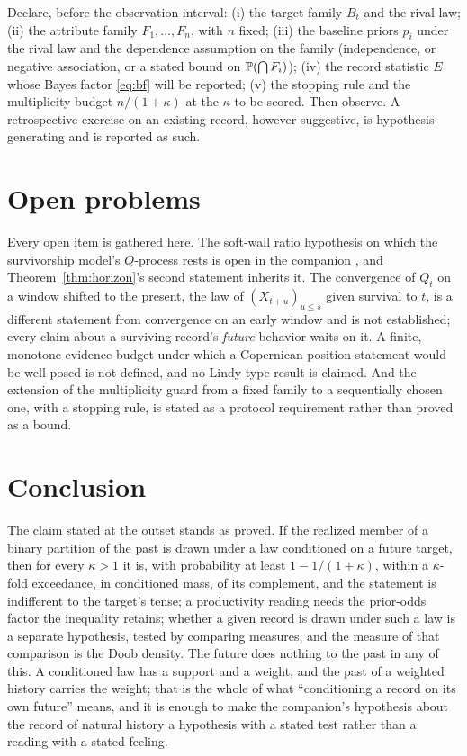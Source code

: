 \begin{definition}\label{def:protocol}
Declare, before the observation interval: (i) the target family $B_t$ and
the rival law; (ii) the attribute family $F_1,\dots,F_n$, with $n$ fixed;
(iii) the baseline priors $p_i$ under the rival law and the dependence
assumption on the family (independence, or negative association, or a
stated bound on $\mathbb{P}(\bigcap F_i)$); (iv) the record statistic $E$ whose
Bayes factor \eqref{eq:bf} will be reported; (v) the stopping rule and
the multiplicity budget $n/(1+\kappa)$ at the $\kappa$ to be scored. Then
observe. A retrospective exercise on an existing record, however
suggestive, is hypothesis-generating and is reported as such.
\end{definition}

\section{Open problems}\label{sec:open}

Every open item is gathered here. The soft-wall ratio hypothesis on which
the survivorship model's $Q$-process rests is open in the companion
\cite{GoldenSurvivorship}, and Theorem~\ref{thm:horizon}'s second statement inherits
it. The convergence of $Q_t$ on a window shifted to the present, the law
of $(X_{t+u})_{u\le s}$ given survival to $t$, is a different statement
from convergence on an early window and is not established; every claim
about a surviving record's \emph{future} behavior waits on it. A finite,
monotone evidence budget under which a Copernican position statement
would be well posed is not defined, and no Lindy-type result is claimed.
And the extension of the multiplicity guard from a fixed family to a
sequentially chosen one, with a stopping rule, is stated as a protocol
requirement rather than proved as a bound.

\section{Conclusion}\label{sec:conclusion}

The claim stated at the outset stands as proved. If the realized member
of a binary partition of the past is drawn under a law conditioned on a
future target, then for every $\kappa>1$ it is, with probability at least
$1-1/(1+\kappa)$, within a $\kappa$-fold exceedance, in conditioned mass, of its complement, and the statement is indifferent to the target's tense; a productivity reading needs the prior-odds factor the inequality retains; whether a given record is drawn under such a law is a
separate hypothesis, tested by comparing measures, and the measure of
that comparison is the Doob density. The future does nothing to the past
in any of this. A conditioned law has a support and a weight, and the
past of a weighted history carries the weight; that is the whole of what
``conditioning a record on its own future'' means, and it is enough to
make the companion's hypothesis about the record of natural history a
hypothesis with a stated test rather than a reading with a stated
feeling.

\printbibliography
